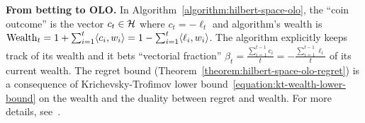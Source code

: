 \textbf{From betting to \ac{OLO}.}
In Algorithm~\ref{algorithm:hilbert-space-olo}, the ``coin outcome'' is the
vector $c_t \in \mathcal{H}$ where $c_t = -\ell_t$ and algorithm's wealth is $\operatorname{Wealth}_t
= 1 + \sum_{i=1}^t \langle c_i, w_i \rangle = 1 - \sum_{i=1}^t \langle \ell_i,
w_i \rangle$.  The algorithm explicitly keeps track of its wealth and it bets
``vectorial fraction'' $\beta_t = \tfrac{\sum_{i=1}^{t-1} c_i}{t} = -
\tfrac{\sum_{i=1}^{t-1}\ell_i}{t}$ of its current wealth. The regret bound
(Theorem~\ref{theorem:hilbert-space-olo-regret}) is a consequence of
Krichevsky-Trofimov lower bound~\eqref{equation:kt-wealth-lower-bound} on the
wealth and the duality between regret and wealth.  For more details,
see~\cite{Orabona-Pal-2016-parameter-free}.
